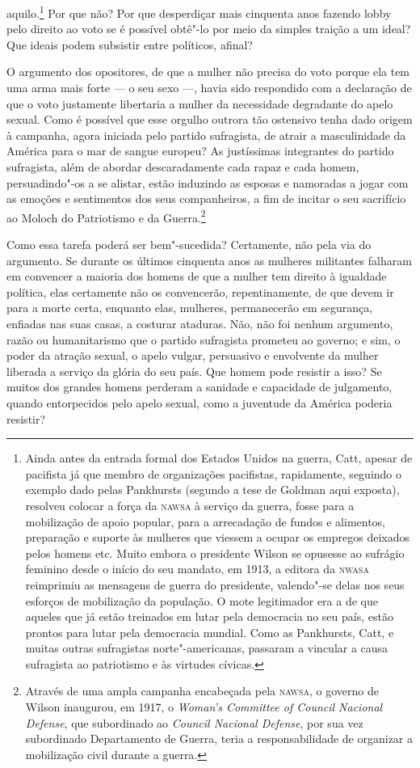 aquilo.\footnote{Ainda antes da entrada formal dos Estados Unidos na
  guerra, Catt, apesar de pacifista já que membro de organizações pacifistas,
  rapidamente, seguindo o exemplo dado pelas Pankhursts (segundo a tese
  de Goldman aqui exposta), resolveu colocar a força da \textsc{nawsa} à
  serviço da guerra, fosse para a mobilização de apoio popular, para a
  arrecadação de fundos e alimentos, preparação e suporte às mulheres
  que viessem a ocupar os empregos deixados pelos homens etc. Muito
  embora o presidente Wilson se opusesse ao sufrágio feminino desde o
  início do seu mandato, em 1913, a editora da \textsc{nwasa} reimprimiu as
  mensagens de guerra do presidente, valendo"-se delas nos seus esforços
  de mobilização da população. O mote legitimador era a de que aqueles
  que já estão treinados em lutar pela democracia no seu país, estão
  prontos para lutar pela democracia mundial. Como as Pankhursts, Catt,
  e muitas outras sufragistas norte"-americanas, passaram a vincular a
  causa sufragista ao patriotismo e às virtudes cívicas.} Por que não?
Por que desperdiçar mais cinquenta anos fazendo lobby pelo direito ao
voto se é possível obtê"-lo por meio da simples traição a um ideal? Que
ideais podem subsistir entre políticos, afinal?

O argumento dos opositores, de que a mulher não precisa do voto porque
ela tem uma arma mais forte --- o seu sexo ---, havia sido respondido com
a declaração de que o voto justamente libertaria a mulher da necessidade
degradante do apelo sexual. Como é possível que esse orgulho outrora tão ostensivo
tenha dado origem à campanha, agora iniciada pelo partido sufragista, de
atrair a masculinidade da América para o mar de sangue europeu? As
justíssimas integrantes do partido sufragista, além de abordar
descaradamente cada rapaz e cada homem, persuadindo"-os a se alistar,
estão induzindo as esposas e namoradas a jogar com as emoções e
sentimentos dos seus companheiros, a fim de incitar o seu sacrifício ao
Moloch do Patriotismo e da Guerra.\footnote{Através de uma ampla
  campanha encabeçada pela \textsc{nawsa}, o governo de Wilson inaugurou, em
  1917, o \emph{Woman's Committee of Council Nacional Defense}, que
  subordinado ao \emph{Council Nacional Defense}, por sua vez
  subordinado Departamento de Guerra, teria a responsabilidade de
  organizar a mobilização civil durante a guerra.}

Como essa tarefa poderá ser bem"-sucedida? Certamente, não pela via do
argumento. Se durante os últimos cinquenta anos as mulheres militantes
falharam em convencer a maioria dos homens de que a mulher tem direito
à igualdade política, elas certamente não os convencerão,
repentinamente, de que devem ir para a morte certa, enquanto elas,
mulheres, permanecerão em segurança, enfiadas nas suas casas, a costurar
ataduras. Não, não foi nenhum argumento, razão ou humanitarismo que o
partido sufragista prometeu ao governo; e sim, o poder da atração
sexual, o apelo vulgar, persuasivo e envolvente da mulher liberada a
serviço da glória do seu país. Que homem pode resistir a isso? Se muitos
dos grandes homens perderam a sanidade e capacidade de julgamento,
quando entorpecidos pelo apelo sexual, como a juventude da América
poderia resistir?


